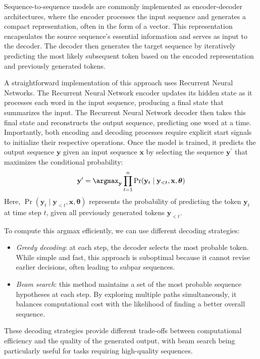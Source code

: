 Sequence-to-sequence models are commonly implemented as encoder-decoder architectures, where the encoder processes the input sequence and generates a compact representation, often in the form of a vector.
This representation encapsulates the source sequence's essential information and serves as input to the decoder. 
The decoder then generates the target sequence by iteratively predicting the most likely subsequent token based on the encoded representation and previously generated tokens.

A straightforward implementation of this approach uses Recurrent Neural Networks.
The Recurrent Neural Network encoder updates its hidden state as it processes each word in the input sequence, producing a final state that summarizes the input. 
The Recurrent Neural Network decoder then takes this final state and reconstructs the output sequence, predicting one word at a time.
Importantly, both encoding and decoding processes require explicit start signals to initialize their respective operations.
Once the model is trained, it predicts the output sequence $\mathbf{y}$ given an input sequence $\mathbf{x}$ by selecting the sequence $\mathbf{y}^\prime$ that maximizes the conditional probability:
\[\mathbf{y}^\prime=\argmax_\mathbf{y}\prod_{t=1}^n\Pr(\mathbf{y}_t\mid\mathbf{y}_{<t},\mathbf{x},\boldsymbol{\theta})\]
Here, $\Pr(\mathbf{y}_t\mid\mathbf{y}_{<t},\mathbf{x},\boldsymbol{\theta})$ represents the probability of predicting the token $\mathbf{y}_t$ at time step $t$, given all previously generated tokens $\mathbf{y}_{<t}$. 

To compute this argmax efficiently, we can use different decoding strategies:
\begin{itemize}
    \item \textit{Greedy decoding}: at each step, the decoder selects the most probable token. While simple and fast, this approach is suboptimal because it cannot revise earlier decisions, often leading to subpar sequences.
    \item \textit{Beam search}: this method maintains a set of the most probable sequence hypotheses at each step. 
        By exploring multiple paths simultaneously, it balances computational cost with the likelihood of finding a better overall sequence.
\end{itemize}
These decoding strategies provide different trade-offs between computational efficiency and the quality of the generated output, with beam search being particularly useful for tasks requiring high-quality sequences.

